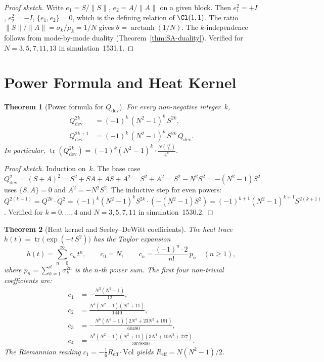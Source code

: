 \documentclass[aps,prd,twocolumn,superscriptaddress,floatfix,nofootinbib]{revtex4-2}
\newtheorem{theorem}{Theorem}
\theoremstyle{definition}
\theoremstyle{remark}
\begin{document}
\begin{proof}[Proof sketch]
Write $e_1 = S/\|S\|$, $e_2 = A/\|A\|$ on a given block.
Then $e_1^2 = +I$, $e_2^2 = -I$, $\{e_1,e_2\} = 0$, which is
the defining relation of $\Cl(1,1)$.  The ratio
$\|S\|/\|A\| = \sigma_k/\mu_k = 1/N$ gives
$\theta = \operatorname{arctanh}(1/N)$.
The $k$-independence follows from mode-by-mode duality
(Theorem~\ref{thm:SA-duality}).
Verified for $N = 3,5,7,11,13$ in simulation~1531.1.
\end{proof}


\section{Power Formula and Heat Kernel}\label{sec:power-heat}

\begin{theorem}[Power formula for $Q_{\mathrm{dev}}$]%
  \label{thm:power-formula}
For every non-negative integer~$k$,
\begin{align}
  Q_{\mathrm{dev}}^{2k}   &= (-1)^k\,(N^2-1)^k\,S^{2k},
    \label{eq:Q-even}\\
  Q_{\mathrm{dev}}^{2k+1} &= (-1)^k\,(N^2-1)^k\,S^{2k}\,Q_{\mathrm{dev}}.
    \label{eq:Q-odd}
\end{align}
In particular, $\operatorname{tr}(Q_{\mathrm{dev}}^{2k})
= (-1)^k (N^2-1)^k \cdot \frac{N\binom{2k}{k}}{4^k}$.
\end{theorem}

\begin{proof}[Proof sketch]
Induction on~$k$.  The base case $Q_{\mathrm{dev}}^2
= (S+A)^2 = S^2 + SA + AS + A^2 = S^2 + A^2
= S^2 - N^2 S^2 = -(N^2-1)S^2$ uses $\{S,A\}=0$ and
$A^2 = -N^2 S^2$.  The inductive step for even powers:
$Q^{2(k+1)} = Q^{2k}\cdot Q^2
= (-1)^k(N^2-1)^k S^{2k}\cdot(-(N^2-1)S^2)
= (-1)^{k+1}(N^2-1)^{k+1}S^{2(k+1)}$.
Verified for $k = 0,\ldots,4$ and $N = 3,5,7,11$ in simulation~1530.2.
\end{proof}

\begin{theorem}[Heat kernel and Seeley--DeWitt coefficients]%
  \label{thm:heat-kernel}
The heat trace $h(t) = \operatorname{tr}\!\bigl(\exp(-t\,S^2)\bigr)$
has the Taylor expansion
\[
  h(t) = \sum_{n=0}^{\infty} c_n\,t^n, \qquad
  c_0 = N, \qquad
  c_n = \frac{(-1)^n\cdot 2}{n!}\,p_n \quad (n \ge 1),
\]
where $p_n = \sum_{k=1}^{d}\sigma_k^{2n}$ is the $n$-th power sum.
The first four non-trivial coefficients are:
\begin{align*}
  c_1 &= -\tfrac{N^2(N^2-1)}{12},\\
  c_2 &= \tfrac{N^4(N^2-1)(N^2+11)}{1440},\\
  c_3 &= -\tfrac{N^6(N^2-1)(2N^4+23N^2+191)}{60480},\\
  c_4 &= \tfrac{N^8(N^2-1)(N^2+11)(3N^4+10N^2+227)}{3628800}.
\end{align*}
The Riemannian reading $c_1 = -\frac{1}{6}R_{\mathrm{eff}}\cdot\mathrm{Vol}$
yields $R_{\mathrm{eff}} = N(N^2-1)/2$.
\end{theorem}
\end{document}
